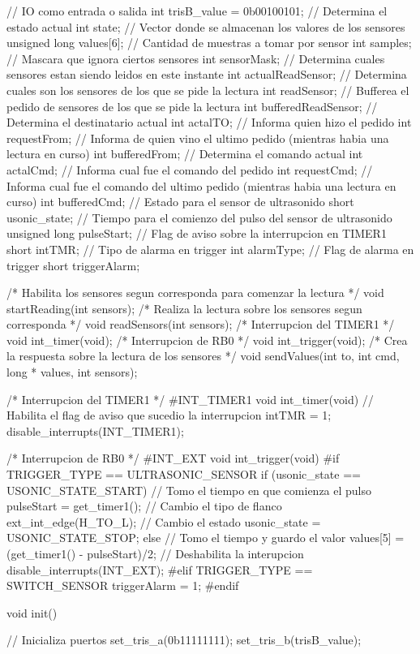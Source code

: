 {\begin{verbatimtab}
// IO como entrada o salida
int trisB_value = 0b00100101;
// Determina el estado actual
int state;
// Vector donde se almacenan los valores de los sensores
unsigned long values[6];
// Cantidad de muestras a tomar por sensor
int samples;
// Mascara que ignora ciertos sensores
int sensorMask;
// Determina cuales sensores estan siendo leidos en este instante
int actualReadSensor;
// Determina cuales son los sensores de los que se pide la lectura
int readSensor;
// Bufferea el pedido de sensores de los que se pide la lectura
int bufferedReadSensor;
// Determina el destinatario actual
int actalTO;
// Informa quien hizo el pedido
int requestFrom;
// Informa de quien vino el ultimo pedido (mientras habia una lectura en curso)
int bufferedFrom;
// Determina el comando actual
int actalCmd;
// Informa cual fue el comando del pedido
int requestCmd;
// Informa cual fue el comando del ultimo pedido (mientras habia una lectura en curso)
int bufferedCmd;
// Estado para el sensor de ultrasonido
short usonic_state;
// Tiempo para el comienzo del pulso del sensor de ultrasonido
unsigned long pulseStart;
// Flag de aviso sobre la interrupcion en TIMER1
short intTMR;
// Tipo de alarma en trigger
int alarmType;
// Flag de alarma en trigger
short triggerAlarm;

/* Habilita los sensores segun corresponda para comenzar la lectura */
void startReading(int sensors);
/* Realiza la lectura sobre los sensores segun corresponda */
void readSensors(int sensors);
/* Interrupcion del TIMER1 */
void int_timer(void);
/* Interrupcion de RB0 */
void int_trigger(void);
/* Crea la respuesta sobre la lectura de los sensores */
void sendValues(int to, int cmd, long * values, int sensors);

/* Interrupcion del TIMER1 */
#INT_TIMER1
void int_timer(void)
{
	// Habilita el flag de aviso que sucedio la interrupcion
	intTMR = 1;
	disable_interrupts(INT_TIMER1);
}

/* Interrupcion de RB0 */
#INT_EXT
void int_trigger(void)
{
#if TRIGGER_TYPE == ULTRASONIC_SENSOR
	if (usonic_state == USONIC_STATE_START)
	{
		// Tomo el tiempo en que comienza el pulso
		pulseStart = get_timer1();
		// Cambio el tipo de flanco
		ext_int_edge(H_TO_L);
		// Cambio el estado
		usonic_state = USONIC_STATE_STOP;
	} else {
		// Tomo el tiempo y guardo el valor
		values[5] = (get_timer1() - pulseStart)/2;
		// Deshabilita la interupcion
		disable_interrupts(INT_EXT);
	}
#elif TRIGGER_TYPE == SWITCH_SENSOR
	triggerAlarm = 1;
#endif
}

void init()
{
	// Inicializa puertos
	set_tris_a(0b11111111);
	set_tris_b(trisB_value);

}
\end{verbatimtab}}
